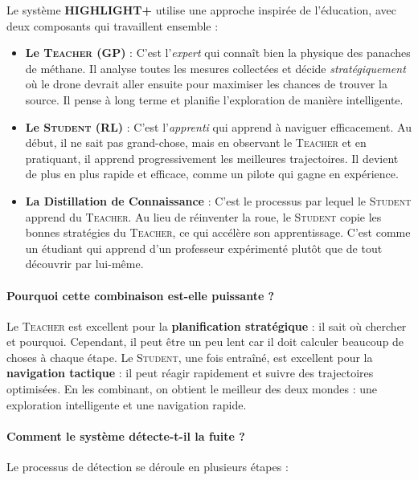 \documentclass[12pt,a4paper]{article}
\newcommand{\highlight}{\textbf{HIGHLIGHT+}}
\newcommand{\teacher}{\textsc{Teacher}}
\newcommand{\student}{\textsc{Student}}
\newcommand{\gp}{\textsc{GP}}
\newcommand{\rl}{\textsc{RL}}
\begin{document}
Le système \highlight{} utilise une approche inspirée de l'éducation, avec deux composants qui travaillent ensemble :

\begin{itemize}
    \item \textbf{Le \teacher{} (\gp{})} : C'est l'\textit{expert} qui connaît bien la physique des panaches de méthane. Il analyse toutes les mesures collectées et décide \textit{stratégiquement} où le drone devrait aller ensuite pour maximiser les chances de trouver la source. Il pense à long terme et planifie l'exploration de manière intelligente.
    
    \item \textbf{Le \student{} (\rl{})} : C'est l'\textit{apprenti} qui apprend à naviguer efficacement. Au début, il ne sait pas grand-chose, mais en observant le \teacher{} et en pratiquant, il apprend progressivement les meilleures trajectoires. Il devient de plus en plus rapide et efficace, comme un pilote qui gagne en expérience.
    
    \item \textbf{La Distillation de Connaissance} : C'est le processus par lequel le \student{} apprend du \teacher{}. Au lieu de réinventer la roue, le \student{} copie les bonnes stratégies du \teacher{}, ce qui accélère son apprentissage. C'est comme un étudiant qui apprend d'un professeur expérimenté plutôt que de tout découvrir par lui-même.
\end{itemize}

\paragraph{Pourquoi cette combinaison est-elle puissante ?}

Le \teacher{} est excellent pour la \textbf{planification stratégique} : il sait où chercher et pourquoi. Cependant, il peut être un peu lent car il doit calculer beaucoup de choses à chaque étape. Le \student{}, une fois entraîné, est excellent pour la \textbf{navigation tactique} : il peut réagir rapidement et suivre des trajectoires optimisées. En les combinant, on obtient le meilleur des deux mondes : une exploration intelligente et une navigation rapide.

\paragraph{Comment le système détecte-t-il la fuite ?}

Le processus de détection se déroule en plusieurs étapes :
\end{document}
